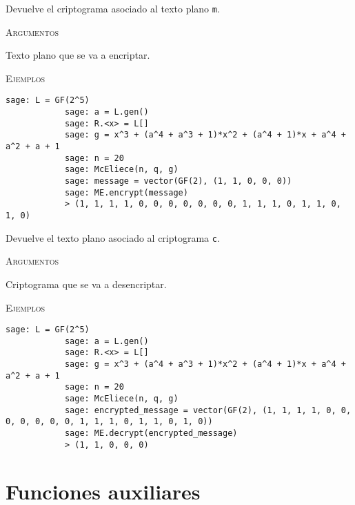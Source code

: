 \begin{description}[leftmargin=1em, font=\normalfont\ttfamily, style=nextline]
\begin{description}[font=\ttfamily, style=nextline]
        \item[encrypt(self, m)] Devuelve el criptograma asociado al texto plano \texttt{m}.

        \textsc{Argumentos}
        \begin{description}[font=\normalfont\ttfamily]
            \item[m] Texto plano que se va a encriptar.
        \end{description}
        
        \textsc{Ejemplos}
        \begin{lstlisting}[gobble=4]
            sage: L = GF(2^5)
            sage: a = L.gen()
            sage: R.<x> = L[]
            sage: g = x^3 + (a^4 + a^3 + 1)*x^2 + (a^4 + 1)*x + a^4 + a^2 + a + 1
            sage: n = 20
            sage: McEliece(n, q, g)
            sage: message = vector(GF(2), (1, 1, 0, 0, 0))
            sage: ME.encrypt(message)
            > (1, 1, 1, 1, 0, 0, 0, 0, 0, 0, 0, 1, 1, 1, 0, 1, 1, 0, 1, 0)
        \end{lstlisting}

        \item[decrypt(self, c)] Devuelve el texto plano asociado al criptograma \texttt{c}.

        \textsc{Argumentos}
        \begin{description}[font=\normalfont\ttfamily]
            \item[c] Criptograma que se va a desencriptar.
        \end{description}
        
        \textsc{Ejemplos}
        \begin{lstlisting}[gobble=4]
            sage: L = GF(2^5)
            sage: a = L.gen()
            sage: R.<x> = L[]
            sage: g = x^3 + (a^4 + a^3 + 1)*x^2 + (a^4 + 1)*x + a^4 + a^2 + a + 1
            sage: n = 20
            sage: McEliece(n, q, g)
            sage: encrypted_message = vector(GF(2), (1, 1, 1, 1, 0, 0, 0, 0, 0, 0, 0, 1, 1, 1, 0, 1, 1, 0, 1, 0))
            sage: ME.decrypt(encrypted_message)
            > (1, 1, 0, 0, 0)
        \end{lstlisting}
    \end{description}
\end{description}

\section{Funciones auxiliares}

